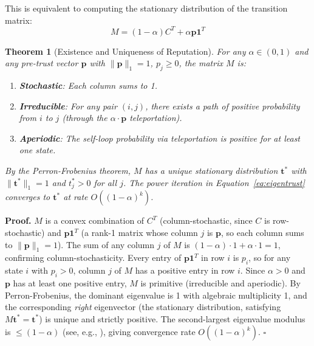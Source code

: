 \documentclass[11pt]{article}
\newtheorem{theorem}{Theorem}[section]
\newcommand{\qed}{\hfill}
\newenvironment{proof}{\noindent\textbf{Proof.}}{\qed$\square$\par\medskip}
\begin{document}
This is equivalent to computing the stationary distribution of the transition matrix:
\begin{equation}
    M = (1 - \alpha) C^T + \alpha \mathbf{p} \mathbf{1}^T
\end{equation}

\begin{theorem}[Existence and Uniqueness of Reputation]\label{thm:convergence}
For any $\alpha \in (0, 1)$ and any pre-trust vector $\mathbf{p}$ with $\|\mathbf{p}\|_1 = 1$, $p_j \geq 0$, the matrix $M$ is:
\begin{enumerate}
    \item \textbf{Stochastic}: Each column sums to 1.
    \item \textbf{Irreducible}: For any pair $(i, j)$, there exists a path of positive probability from $i$ to $j$ (through the $\alpha \cdot \mathbf{p}$ teleportation).
    \item \textbf{Aperiodic}: The self-loop probability via teleportation is positive for at least one state.
\end{enumerate}
By the Perron-Frobenius theorem, $M$ has a unique stationary distribution $\mathbf{t}^*$ with $\|\mathbf{t}^*\|_1 = 1$ and $t^*_j > 0$ for all $j$. The power iteration in Equation~\eqref{eq:eigentrust} converges to $\mathbf{t}^*$ at rate $O((1-\alpha)^k)$.
\end{theorem}

\begin{proof}
$M$ is a convex combination of $C^T$ (column-stochastic, since $C$ is row-stochastic) and $\mathbf{p}\mathbf{1}^T$ (a rank-1 matrix whose column $j$ is $\mathbf{p}$, so each column sums to $\|\mathbf{p}\|_1 = 1$). The sum of any column $j$ of $M$ is $(1-\alpha) \cdot 1 + \alpha \cdot 1 = 1$, confirming column-stochasticity. Every entry of $\mathbf{p}\mathbf{1}^T$ in row $i$ is $p_i$, so for any state $i$ with $p_i > 0$, column $j$ of $M$ has a positive entry in row $i$. Since $\alpha > 0$ and $\mathbf{p}$ has at least one positive entry, $M$ is primitive (irreducible and aperiodic). By Perron-Frobenius, the dominant eigenvalue is 1 with algebraic multiplicity 1, and the corresponding \emph{right} eigenvector (the stationary distribution, satisfying $M\mathbf{t}^* = \mathbf{t}^*$) is unique and strictly positive. The second-largest eigenvalue modulus is $\leq (1-\alpha)$ (see, e.g., \cite[Theorem~5.1]{kamvar2003}), giving convergence rate $O((1-\alpha)^k)$. \qed
\end{proof}
\end{document}
